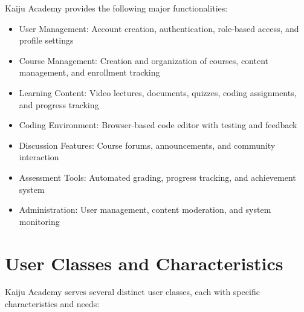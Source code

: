 \documentclass[a4paper, 11pt]{scrreprt}
\begin{document}
Kaiju Academy provides the following major functionalities:

\begin{itemize}
    \item User Management: Account creation, authentication, role-based access, and profile settings
    
    \item Course Management: Creation and organization of courses, content management, and enrollment tracking
    
    \item Learning Content: Video lectures, documents, quizzes, coding assignments, and progress tracking
    
    \item Coding Environment: Browser-based code editor with testing and feedback
    
    \item Discussion Features: Course forums, announcements, and community interaction
    
    \item Assessment Tools: Automated grading, progress tracking, and achievement system
    
    \item Administration: User management, content moderation, and system monitoring
\end{itemize}

\section{User Classes and Characteristics}

Kaiju Academy serves several distinct user classes, each with specific characteristics and needs:
\end{document}
